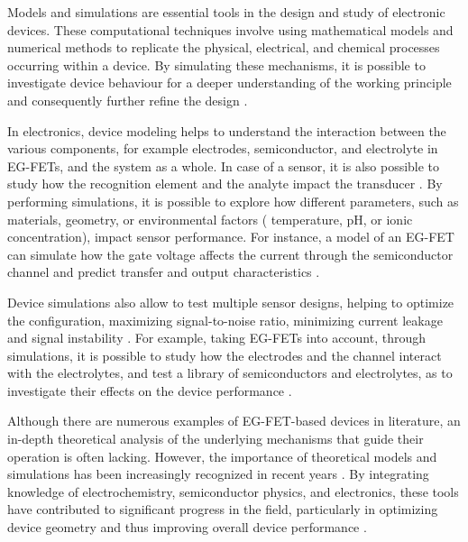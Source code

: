 Models and simulations are essential tools in the design and study of electronic devices. These computational techniques involve using mathematical models and numerical methods to replicate the physical, electrical, and chemical processes occurring within a device. By simulating these mechanisms, it is possible to investigate device behaviour for a deeper understanding of the working principle and consequently further refine the design \citep{chenModeling2010, shamsirSemiconductor2020}.

In electronics, device modeling helps to understand the interaction between the various components, for example electrodes, semiconductor, and electrolyte in EG-FETs, and the system as a whole. In case of a sensor, it is also possible to study how the recognition element and the analyte impact the transducer \citep{franchinMultiphysics2024}. By performing simulations, it is possible to explore how different parameters, such as materials, geometry, or environmental factors (\eg{} temperature, pH, or ionic concentration), impact sensor performance. For instance, a model of an EG-FET can simulate how the gate voltage affects the current through the semiconductor channel and predict transfer and output characteristics \citep{delavariNernst2021, chennitInkjetPrinted2023}.

Device simulations also allow to test multiple sensor designs, helping to optimize the configuration, maximizing signal-to-noise ratio, minimizing current leakage and signal instability \citep{zojerSimulation2021}. For example, taking EG-FETs into account, through simulations, it is possible to study how the electrodes and the channel interact with the electrolytes, and test a library of semiconductors and electrolytes, as to investigate their effects on the device performance \citep{melzerCharacterization2014}.

Although there are numerous examples of EG-FET-based devices in literature, an in-depth theoretical analysis of the underlying mechanisms that guide their operation is often lacking. However, the importance of theoretical models and simulations has been increasingly recognized in recent years \citep{chennitInkjetPrinted2023, delavariNernst2021, masseyModeling2021,hayatiCNTMOSFET2010, heitzingerModeling2008, huetterAnalytical2023, melzerCharacterization2014, popescuModeling2015}. By integrating knowledge of electrochemistry, semiconductor physics, and electronics, these tools have contributed to significant progress in the field, particularly in optimizing device geometry and thus improving overall device performance \citep{popescuModeling2015}.


